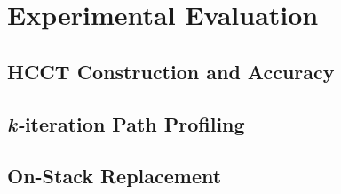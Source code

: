 \chapter{Experimental Evaluation}
\label{ch:experiments}

\section{HCCT Construction and Accuracy}

\section{{\em k-}iteration Path Profiling}

\section{On-Stack Replacement}